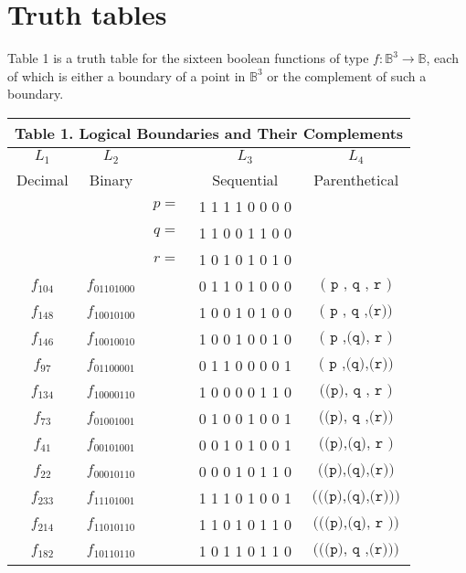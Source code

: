 \documentclass[12pt]{article}
\begin{document}
\section{Truth tables}

Table 1 is a truth table for the sixteen boolean functions of type $f : \mathbb{B}^3 \to \mathbb{B}$, each of which is either a boundary of a point in $\mathbb{B}^3$ or the complement of such a boundary.

\begin{center}
\begin{tabular}{|c|c|c|c|c|}
\multicolumn{5}{c}{\textbf{Table 1.  Logical Boundaries and Their Complements}}
\\[2pt]\hline
$L_1$   & $L_2$            &       & $L_3$           & $L_4$
\\[2pt]
Decimal & Binary           &       & Sequential      & Parenthetical
\\[2pt]\hline
        &                  & $p =$ & 1 1 1 1 0 0 0 0 &
\\[2pt]
        &                  & $q =$ & 1 1 0 0 1 1 0 0 &
\\[2pt]
        &                  & $r =$ & 1 0 1 0 1 0 1 0 &
\\[2pt]\hline
$f_{104}$ & $f_{01101000}$ &       & 0 1 1 0 1 0 0 0 & $\texttt{(~p~,~q~,~r~)}$
\\[2pt]
$f_{148}$ & $f_{10010100}$ &       & 1 0 0 1 0 1 0 0 & $\texttt{(~p~,~q~,(r))}$
\\[2pt]
$f_{146}$ & $f_{10010010}$ &       & 1 0 0 1 0 0 1 0 & $\texttt{(~p~,(q),~r~)}$
\\[2pt]
$f_{97}$  & $f_{01100001}$ &       & 0 1 1 0 0 0 0 1 & $\texttt{(~p~,(q),(r))}$
\\[2pt]
$f_{134}$ & $f_{10000110}$ &       & 1 0 0 0 0 1 1 0 & $\texttt{((p),~q~,~r~)}$
\\[2pt]
$f_{73}$  & $f_{01001001}$ &       & 0 1 0 0 1 0 0 1 & $\texttt{((p),~q~,(r))}$
\\[2pt]
$f_{41}$  & $f_{00101001}$ &       & 0 0 1 0 1 0 0 1 & $\texttt{((p),(q),~r~)}$
\\[2pt]
$f_{22}$  & $f_{00010110}$ &       & 0 0 0 1 0 1 1 0 & $\texttt{((p),(q),(r))}$
\\[2pt]\hline
$f_{233}$ & $f_{11101001}$ &       & 1 1 1 0 1 0 0 1 & $\texttt{(((p),(q),(r)))}$
\\[2pt]
$f_{214}$ & $f_{11010110}$ &       & 1 1 0 1 0 1 1 0 & $\texttt{(((p),(q),~r~))}$
\\[2pt]
$f_{182}$ & $f_{10110110}$ &       & 1 0 1 1 0 1 1 0 & $\texttt{(((p),~q~,(r)))}$

\end{tabular}
\end{center}
\end{document}
